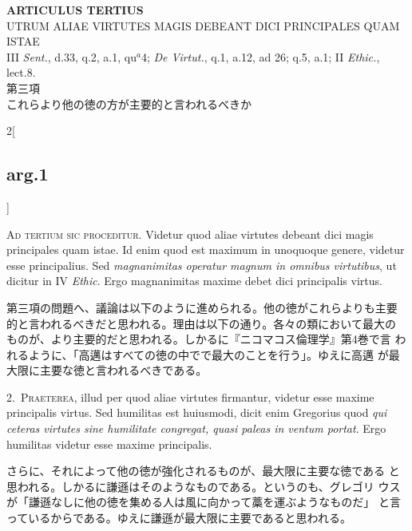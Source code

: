 \documentclass[paper=a4paper,fontsize=10pt,jafontsize=9pt,titlepage]{jlreq}
\begin{document}
\newpage
{}
{}
\setcounter{section}{3}
\setcounter{subsection}{0}


\begin{center}
{\Large {\bfseries ARTICULUS TERTIUS}}\\
{\large UTRUM ALIAE VIRTUTES MAGIS DEBEANT DICI PRINCIPALES QUAM ISTAE}\\
{\footnotesize III {\itshape Sent.}, d.33, q.2, a.1, qu$^{a}$4; {\itshape De Virtut.}, q.1, a.12, ad 26; q.5, a.1; II {\itshape Ethic.}, lect.8.}\\
{\Large 第三項\\これらより他の徳の方が主要的と言われるべきか}
\end{center}

\begin{paracol}{2}[\subsection{arg.1}]

{\scshape Ad tertium sic proceditur}. Videtur quod aliae virtutes
debeant dici magis principales quam istae. Id enim quod est maximum in
unoquoque genere, videtur esse principalius. Sed {\itshape
magnanimitas operatur magnum in omnibus virtutibus}, ut dicitur in IV
{\itshape Ethic}. Ergo magnanimitas maxime debet dici principalis
virtus.

\switchcolumn

第三項の問題へ、議論は以下のように進められる。他の徳がこれらよりも主要
的と言われるべきだと思われる。理由は以下の通り。各々の類において最大の
ものが、より主要的だと思われる。しかるに『ニコマコス倫理学』第4巻で言
われるように、「高邁はすべての徳の中でで最大のことを行う」。ゆえに高邁
が最大限に主要な徳と言われるべきである。


2.~{\scshape Praeterea}, illud per quod aliae virtutes firmantur,
videtur esse maxime principalis virtus. Sed humilitas est huiusmodi,
dicit enim Gregorius quod {\itshape qui ceteras virtutes sine
humilitate congregat, quasi paleas in ventum portat}. Ergo humilitas
videtur esse maxime principalis.

\switchcolumn

さらに、それによって他の徳が強化されるものが、最大限に主要な徳である
 と思われる。しかるに謙遜はそのようなものである。というのも、グレゴリ
 ウスが「謙遜なしに他の徳を集める人は風に向かって藁を運ぶようなものだ」
 と言っているからである。ゆえに謙遜が最大限に主要であると思われる。


\end{paracol}
\end{document}
